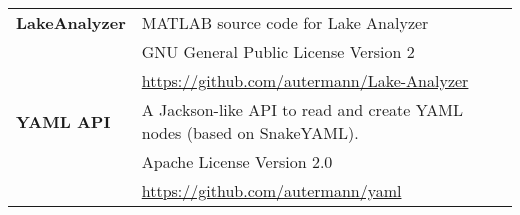 \begin{center}
\begin{small}
\begin{tabularx}{\linewidth}{@{}lX@{}}
	    \textbf{LakeAnalyzer}
	    & MATLAB source code for Lake Analyzer\\
	    & GNU General Public License Version 2\\
	    & \url{https://github.com/autermann/Lake-Analyzer}\\
	    \cmidrule(r){1-1}
	    \cmidrule(l){2-2}

	    \textbf{YAML API}
	    & A Jackson-like API to read and create YAML nodes (based on SnakeYAML).\\
	    & Apache License Version 2.0\\
	    & \url{https://github.com/autermann/yaml}\\
	    \bottomrule
	  \end{tabularx}
	\end{small}
\end{center}